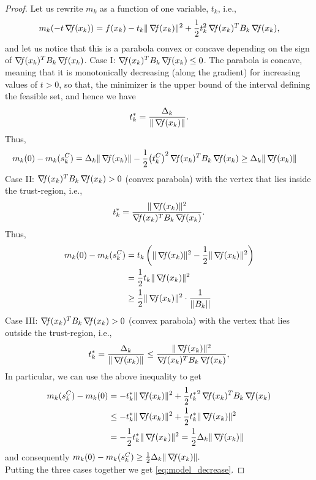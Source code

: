 \documentclass[10pt,a4paper]{article}
\begin{document}
\begin{proof}
	Let us rewrite $m_k$ as a function of one variable, $t_k$, i.e., 
	$$m_k(-t \operatorname*{\mathit{\nabla \!f}}(x_k))=f(x_k) -t_k \|\operatorname*{\mathit{\nabla \!f}}(x_k)\|^2 + \frac{1}{2}t_k^2\operatorname*{\mathit{\nabla \!f}}(x_k)^T B_k\operatorname*{\mathit{\nabla \!f}}(x_k),$$
	and let us notice that this is a parabola convex or concave depending on the sign of $\operatorname*{\mathit{\nabla \!f}}(x_k)^T B_k\operatorname*{\mathit{\nabla \!f}}(x_k)$. 
	Case I: $\operatorname*{\mathit{\nabla \!f}}(x_k)^T B_k \operatorname*{\mathit{\nabla \!f}}(x_k) \leq 0$. The parabola is concave, meaning that it is monotonically decreasing (along the gradient) for increasing values of $t > 0$, so that, the minimizer is the upper bound of the interval defining the feasible set, and hence we have
	\begin{equation*}
		t^*_k = \frac{\Delta_k}{\|\operatorname*{\mathit{\nabla \!f}}(x_k)\|}.
	\end{equation*}
Thus, 
\begin{align*}
	m_k(0) - m_k(s_k^C) & = \Delta_k \|\operatorname*{\mathit{\nabla \!f}}(x_k)\| - \frac{1}{2}{\left(t_k^C\right)}^2\operatorname*{\mathit{\nabla \!f}}(x_k)^T B_k\operatorname*{\mathit{\nabla \!f}}(x_k) \geq \Delta_k \|\operatorname*{\mathit{\nabla \!f}}(x_k)\|
\end{align*}
Case II: $\operatorname*{\mathit{\nabla \!f}}(x_k)^T B_k \operatorname*{\mathit{\nabla \!f}}(x_k) > 0$ (convex parabola) with the vertex that lies inside the trust-region, i.e., 
$$t^*_k = \frac{\|\operatorname*{\mathit{\nabla \!f}}(x_k)\|^2}{\operatorname*{\mathit{\nabla \!f}}(x_k)^T B_k \operatorname*{\mathit{\nabla \!f}}(x_k)}.$$
Thus, 
\begin{align*}
	m_k(0) - m_k(s_k^C) &=  t_k \left(\|\grad(x_k)\|^2 - \frac{1}{2} \|\grad(x_k)\|^2 \right)\\
	& = \frac{1}{2} t_k \|\grad(x_k)\|^2\\
	&\geq \frac{1}{2} \|\grad(x_k)\|^2 \cdot \frac{1}{||B_k||} %
\end{align*}
	Case III: $\operatorname*{\mathit{\nabla \!f}}(x_k)^T B_k \operatorname*{\mathit{\nabla \!f}}(x_k) > 0$ (convex parabola) with the vertex that lies outside the trust-region, i.e., 
	\begin{equation*}
		t^*_k = \frac{\Delta_k}{\|\operatorname*{\mathit{\nabla \!f}}(x_k)\|} \leq \frac{\|\operatorname*{\mathit{\nabla \!f}}(x_k)\|^2}{\operatorname*{\mathit{\nabla \!f}}(x_k)^T B_k \operatorname*{\mathit{\nabla \!f}}(x_k)},
	\end{equation*}
In particular, we can use the above inequality to get
\begin{align*}
m_k(s_k^C) -m_k(0) & =  -t_k^* \|\operatorname*{\mathit{\nabla \!f}}(x_k)\|^2 + \frac{1}{2} {t_k^*}^2 \operatorname*{\mathit{\nabla \!f}}(x_k)^T B_k \operatorname*{\mathit{\nabla \!f}}(x_k) \\
&\leq -t_k^* \|\operatorname*{\mathit{\nabla \!f}}(x_k)\|^2 + \frac{1}{2} t_k^* \|\operatorname*{\mathit{\nabla \!f}}(x_k)\|^2\\
& =-\frac{1}{2} t_k^* \|\operatorname*{\mathit{\nabla \!f}}(x_k)\|^2 = \frac{1}{2} \Delta_k \|\operatorname*{\mathit{\nabla \!f}}(x_k)\|
\end{align*}
and consequently $m_k(0)- m_k(s_k^C) \geq \frac{1}{2} \Delta_k \|\operatorname*{\mathit{\nabla \!f}}(x_k)\|.$\\
Putting the three cases together we get \eqref{eq:model_decrease}.
\end{proof}
\end{document}
